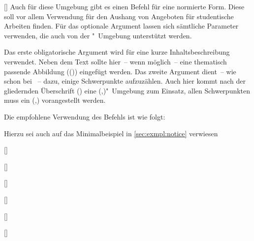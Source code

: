 \begin{Entity*}{}
\begin{Declaration}{%
  [\OList{}]%
}
\printdeclarationlist%
%
Auch für diese Umgebung gibt es einen Befehl für eine normierte Form. Diese 
soll vor allem Verwendung für den Aushang von Angeboten für studentische 
Arbeiten finden. Für das optionale Argument lassen sich sämtliche Parameter 
verwenden, die auch von der "~Umgebung unterstützt werden.

Das erste obligatorische Argument wird für eine kurze Inhaltsbeschreibung 
verwendet. Neben dem Text sollte hier~--  wenn möglich~--  eine thematisch 
passende Abbildung (()) eingefügt 
werden. Das zweite Argument dient~-- wie schon bei ~-- dazu, 
einige Schwerpunkte aufzuzählen. Auch hier kommt nach der gliedernden 
Überschrift () eine 
(,)"~Umgebung zum 
Einsatz, allen Schwerpunkten muss ein 
(,) vorangestellt werden.
\end{Declaration}
%
\begin{Example}
Die empfohlene Verwendung des Befehls  ist wie folgt:
\begin{Code}[escapechar=§]
}{%
  \item Schwerpunkt 1
  \item Schwerpunkt 2
  \item Schwerpunkt 3
}
\end{Code}
Hierzu sei auch auf das Minimalbeispiel in \autoref{sec:exmpl:notice} 
verwiesen%
%
\end{Example}

\begin{Declaration}[v2.02]{[]}
\begin{Declaration'}{%
  []%
}
\begin{Declaration'}{[]}
\begin{Declaration}[v2.02]{[]}
\begin{Declaration}[v2.05]{[]}
\begin{Declaration}{[]}


\end{Declaration}
\end{Declaration}
\end{Declaration}
\end{Declaration'}
\end{Declaration'}
\end{Declaration}
\end{Entity*}

